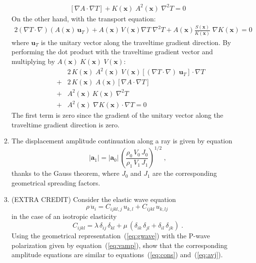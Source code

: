 \begin{enumerate}
\begin{eqnarray}
\left[\nabla A \cdot \nabla T\right] + K(\mathbf{x})\;A^2(\mathbf{x})\;\nabla^2 T = 0
\end{eqnarray}
On the other hand, with the transport equation:
\begin{eqnarray}
2(\nabla T \cdot \nabla)(A(\mathbf{x})\,\mathbf{u}_T)
+ A(\mathbf{x})\,V(\mathbf{x})\nabla T\; \nabla^2T
+ A(\mathbf{x})
\frac{S(\mathbf{x})}{K(\mathbf{x})}\; \nabla K(\mathbf{x}) = 0
\end{eqnarray}
where $\mathbf{u}_T$ is the unitary vector along the traveltime gradient direction.
By performing the dot product with the traveltime gradient vector and multiplying by
$A(\mathbf{x})\;K(\mathbf{x})\;V(\mathbf{x})$:
\begin{eqnarray}
& & 2\,K(\mathbf{x})\; A^2(\mathbf{x})\; V(\mathbf{x}) \left[(\nabla T \cdot \nabla)\;\mathbf{u}_T\right]\cdot\nabla T\\
& + & 2\,K(\mathbf{x})\; A(\mathbf{x})\left[\nabla A \cdot \nabla T\right]\\
& + &  A^2(\mathbf{x})\,K(\mathbf{x})\;\nabla^2T \\
& + & A^2(\mathbf{x})\; \nabla K(\mathbf{x})\cdot\nabla T = 0
\end{eqnarray}
The first term is zero since the gradient of the unitary vector along the traveltime gradient direction is zero.
\item The displacement amplitude continuation along a ray is given by equation 
\begin{equation}
  \label{eq:avj}
  \left|\mathbf{a}_1\right| = \left|\mathbf{a}_0\right|\,
  \left(\frac{\rho_0\,V_0\,J_0}{\rho_1\,V_1\,J_1}\right)^{1/2}\;, 
\end{equation}
thanks to the Gauss theorem,
where $J_0$ and $J_1$ are the corresponding geometrical spreading factors.
\item (EXTRA CREDIT) Consider the elastic wave equation
\begin{equation}
  \label{eq:ewave}
  \rho\,\ddot{u}_i = C_{ijkl,j}\,u_{k,l} + C_{ijkl}\,u_{k,lj}\;
\end{equation}
in the case of an isotropic elasticity
\begin{equation}
  \label{eq:lame}
  C_{ijkl} = \lambda\,\delta_{ij}\,\delta_{kl} + 
  \mu\,(\delta_{ik}\,\delta_{jl} + \delta_{il}\,\delta_{jk})\;.
\end{equation}
Using the geometrical representation~(\ref{eq:gwave}) with the P-wave
polarization given by equation~(\ref{eq:vamp}), show that the
corresponding amplitude equations are similar to
equations~(\ref{eq:cons}) and~(\ref{eq:avj}).
\end{enumerate}

